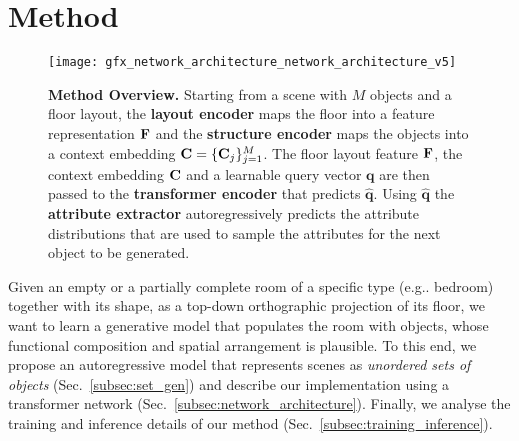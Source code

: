 \documentclass{article}
\makeatletter
\newcommand{\bq}{\mathbf{q}}\newcommand{\bQ}{\mathbf{Q}}
\DeclareRobustCommand\onedot{\futurelet\@let@token\@onedot}
\def\@onedot{\ifx\@let@token.\else.\null\fi\xspace}
\def\eg{e.g\onedot} \def\Eg{E.g\onedot}
\newcommand{\secref}[1]{Sec.~\ref{#1}}
\makeatother
\begin{document}
\section{Method}
\label{sec:method}

\begin{figure*}
\vspace{-2mm}
    \centering
    \texttt{[image: gfx\_network\_architecture\_network\_architecture\_v5]}
    \caption{\small 
        {\bf{Method Overview.}} Starting from a scene with
        $M$ objects and a floor layout, the
        \textbf{layout encoder} maps the floor into a feature representation $\mathbf{F}$ and
        the \textbf{structure encoder} maps the objects into a
        context embedding $\mathbf{C}=\{\mathbf{C}_j\}_{j=1}^M$. The floor
        layout feature $\mathbf{F}$, the context embedding $\mathbf{C}$ and a learnable
        query vector $\bq$ are then passed to the \textbf{transformer
        encoder} that predicts $\hat{\bq}$. Using $\hat{\bq}$ the \textbf{attribute
        extractor} autoregressively predicts the attribute distributions that are used
        to sample the attributes for the next object to be generated.
        }
    \label{fig:method_overview}
    \vspace{-1.2em}
\end{figure*}

Given an empty or a partially complete room of a specific type (\eg bedroom)
together with its shape, as a top-down orthographic projection of its
floor, we want to learn a generative model that populates the room with objects,
whose functional composition and spatial arrangement is plausible. To this end,
we propose an autoregressive model that represents scenes as \emph{unordered
sets of objects} (\secref{subsec:set_gen}) and describe our implementation using a
transformer network (\secref{subsec:network_architecture}). Finally, we analyse
the training and inference details of our method (\secref{subsec:training_inference}).

\vspace{-2mm}
\end{document}
